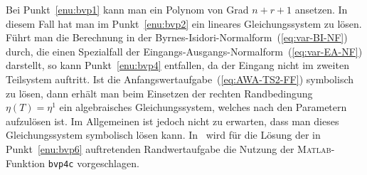 Bei Punkt~\ref{enu:bvp1} kann man ein Polynom von Grad $n+r+1$
ansetzen. In diesem Fall hat man im Punkt~\ref{enu:bvp2} ein lineares
Gleichungssystem zu lösen. Führt man die Berechnung in der Byrnes-Isidori-Normalform~(\ref{eq:var-BI-NF})
durch, die einen Spezialfall der Eingangs-Ausgangs-Normalform~(\ref{eq:var-EA-NF})
darstellt, so kann Punkt~\ref{enu:bvp4} entfallen, da der Eingang
nicht im zweiten Teilsystem auftritt. Ist die Anfangswertaufgabe~(\ref{eq:AWA-TS2-FF})
symbolisch zu lösen, dann erhält man beim Einsetzen der rechten Randbedingung
$\eta(T)=\eta^{1}$ ein algebraisches Gleichungssystem, welches nach
den Parametern aufzulösen ist. Im Allgemeinen ist jedoch nicht zu
erwarten, dass man dieses Gleichungssystem symbolisch lösen kann.
In~\cite{graichen2005,graichen2005ecc,graichen2006at} wird für die
Lösung der in Punkt~\ref{enu:bvp6} auftretenden Randwertaufgabe
die Nutzung der \textsc{Matlab}-Funktion \texttt{bvp4c} vorgeschlagen. 

